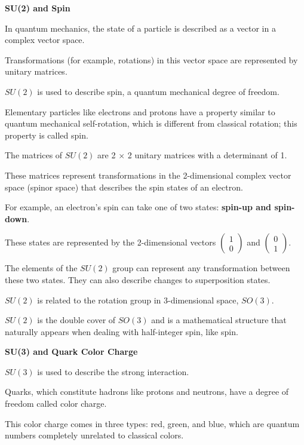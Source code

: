 \documentclass[uplatex,a4j,12pt,dvipdfmx]{jsarticle}
\begin{document}
{}

\textbf{SU(2) and Spin}

In quantum mechanics, the state of a particle is described as a vector in a complex vector space.

Transformations (for example, rotations) in this vector space are represented by unitary matrices.

$SU(2)$ is used to describe spin, a quantum mechanical degree of freedom.

Elementary particles like electrons and protons have a property similar to quantum mechanical self-rotation, which is different from classical rotation; this property is called spin.

The matrices of $SU(2)$ are 2 $\times$ 2 unitary matrices with a determinant of 1.

These matrices represent transformations in the 2-dimensional complex vector space (spinor space) that describes the spin states of an electron.

{}

For example, an electron's spin can take one of two states: \textbf{spin-up and spin-down}.

These states are represented by the 2-dimensional vectors
$
	\begin{pmatrix} 1 \\
		0\end{pmatrix}
$
and
$
	\begin{pmatrix} 0 \\
		1\end{pmatrix}
$.

The elements of the $SU(2)$ group can represent any transformation between these two states.
They can also describe changes to superposition states.

$SU(2)$ is related to the rotation group in 3-dimensional space, $SO(3)$.

$SU(2)$ is the double cover of $SO(3)$ and is a mathematical structure that naturally appears when dealing with half-integer spin, like spin.

{}

\textbf{SU(3) and Quark Color Charge}

$SU(3)$ is used to describe the strong interaction.

Quarks, which constitute hadrons like protons and neutrons, have a degree of freedom called color charge.

This color charge comes in three types: red, green, and blue, which are quantum numbers completely unrelated to classical colors.
\end{document}
